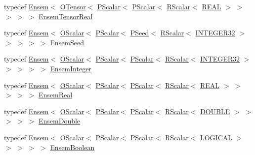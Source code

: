 \begin{DoxyCompactItemize}
\item 
typedef \mbox{\hyperlink{classENSEM_1_1Ensem}{Ensem}}$<$ \mbox{\hyperlink{classENSEM_1_1OTensor}{O\+Tensor}}$<$ \mbox{\hyperlink{classENSEM_1_1PScalar}{P\+Scalar}}$<$ \mbox{\hyperlink{classENSEM_1_1PScalar}{P\+Scalar}}$<$ \mbox{\hyperlink{classENSEM_1_1RScalar}{R\+Scalar}}$<$ \mbox{\hyperlink{namespaceENSEM_a6dd9aa6508168f545c861787e63ddd1e}{R\+E\+AL}} $>$ $>$ $>$ $>$ $>$ \mbox{\hyperlink{group__defs_ga39dae87ed68ca227f7c9025a6e0a55b7}{Ensem\+Tensor\+Real}}
\item 
typedef \mbox{\hyperlink{classENSEM_1_1Ensem}{Ensem}}$<$ \mbox{\hyperlink{classENSEM_1_1OScalar}{O\+Scalar}}$<$ \mbox{\hyperlink{classENSEM_1_1PScalar}{P\+Scalar}}$<$ \mbox{\hyperlink{classENSEM_1_1PSeed}{P\+Seed}}$<$ \mbox{\hyperlink{classENSEM_1_1RScalar}{R\+Scalar}}$<$ \mbox{\hyperlink{namespaceENSEM_a6a58e5c07422c48c5d547184b36719bf}{I\+N\+T\+E\+G\+E\+R32}} $>$ $>$ $>$ $>$ $>$ \mbox{\hyperlink{group__defs_ga698c2e3c5bf93dd51c61ca1234372463}{Ensem\+Seed}}
\item 
typedef \mbox{\hyperlink{classENSEM_1_1Ensem}{Ensem}}$<$ \mbox{\hyperlink{classENSEM_1_1OScalar}{O\+Scalar}}$<$ \mbox{\hyperlink{classENSEM_1_1PScalar}{P\+Scalar}}$<$ \mbox{\hyperlink{classENSEM_1_1PScalar}{P\+Scalar}}$<$ \mbox{\hyperlink{classENSEM_1_1RScalar}{R\+Scalar}}$<$ \mbox{\hyperlink{namespaceENSEM_a6a58e5c07422c48c5d547184b36719bf}{I\+N\+T\+E\+G\+E\+R32}} $>$ $>$ $>$ $>$ $>$ \mbox{\hyperlink{group__defs_gab547eddfe397a7c79b9a4278ab384a2e}{Ensem\+Integer}}
\item 
typedef \mbox{\hyperlink{classENSEM_1_1Ensem}{Ensem}}$<$ \mbox{\hyperlink{classENSEM_1_1OScalar}{O\+Scalar}}$<$ \mbox{\hyperlink{classENSEM_1_1PScalar}{P\+Scalar}}$<$ \mbox{\hyperlink{classENSEM_1_1PScalar}{P\+Scalar}}$<$ \mbox{\hyperlink{classENSEM_1_1RScalar}{R\+Scalar}}$<$ \mbox{\hyperlink{namespaceENSEM_a6dd9aa6508168f545c861787e63ddd1e}{R\+E\+AL}} $>$ $>$ $>$ $>$ $>$ \mbox{\hyperlink{group__defs_ga358cdbc11379b9a4724ad42ae64374da}{Ensem\+Real}}
\item 
typedef \mbox{\hyperlink{classENSEM_1_1Ensem}{Ensem}}$<$ \mbox{\hyperlink{classENSEM_1_1OScalar}{O\+Scalar}}$<$ \mbox{\hyperlink{classENSEM_1_1PScalar}{P\+Scalar}}$<$ \mbox{\hyperlink{classENSEM_1_1PScalar}{P\+Scalar}}$<$ \mbox{\hyperlink{classENSEM_1_1RScalar}{R\+Scalar}}$<$ \mbox{\hyperlink{namespaceENSEM_adcbd0de4e9e0e7ef6aa9b681a554e2c5}{D\+O\+U\+B\+LE}} $>$ $>$ $>$ $>$ $>$ \mbox{\hyperlink{group__defs_gac42383c5825ab6504a44fe73b73027ad}{Ensem\+Double}}
\item 
typedef \mbox{\hyperlink{classENSEM_1_1Ensem}{Ensem}}$<$ \mbox{\hyperlink{classENSEM_1_1OScalar}{O\+Scalar}}$<$ \mbox{\hyperlink{classENSEM_1_1PScalar}{P\+Scalar}}$<$ \mbox{\hyperlink{classENSEM_1_1PScalar}{P\+Scalar}}$<$ \mbox{\hyperlink{classENSEM_1_1RScalar}{R\+Scalar}}$<$ \mbox{\hyperlink{namespaceENSEM_ade7c8d5976e979516f8c2ecd223dd0b6}{L\+O\+G\+I\+C\+AL}} $>$ $>$ $>$ $>$ $>$ \mbox{\hyperlink{group__defs_gac6945505f3ac714277458e0a944c15f0}{Ensem\+Boolean}}

\end{DoxyCompactItemize}
